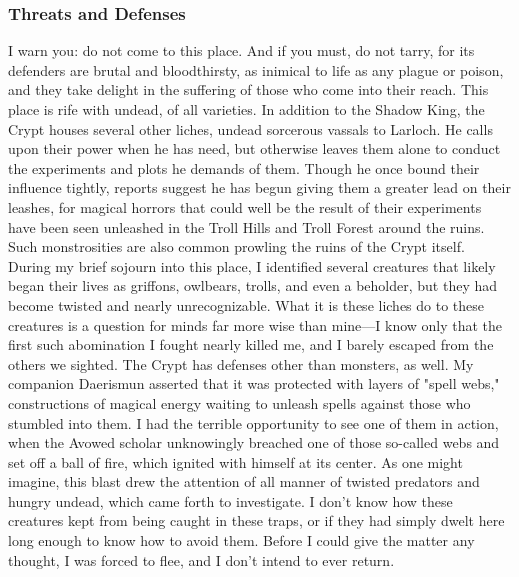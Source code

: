 \documentclass[10pt,a4paper,twoside,twocolumn,openany,bg=print,nodeprecatedcode]{dndbook}
\begin{document}
\subsubsection{Threats and Defenses}
I warn you: do not come to this place. And if you must, do not tarry, for its defenders are brutal and bloodthirsty, as inimical to life as any plague or poison, and they take delight in the suffering of those who come into their reach.
This place is rife with undead, of all varieties. In addition to the Shadow King, the Crypt houses several other liches, undead sorcerous vassals to Larloch. He calls upon their power when he has need, but otherwise leaves them alone to conduct the experiments and plots he demands of them. Though he once bound their influence tightly, reports suggest he has begun giving them a greater lead on their leashes, for magical horrors that could well be the result of their experiments have been seen unleashed in the Troll Hills and Troll Forest around the ruins.
Such monstrosities are also common prowling the ruins of the Crypt itself. During my brief sojourn into this place, I identified several creatures that likely began their lives as griffons, owlbears, trolls, and even a beholder, but they had become twisted and nearly unrecognizable. What it is these liches do to these creatures is a question for minds far more wise than mine—I know only that the first such abomination I fought nearly killed me, and I barely escaped from the others we sighted.
The Crypt has defenses other than monsters, as well. My companion Daerismun asserted that it was protected with layers of "spell webs," constructions of magical energy waiting to unleash spells against those who stumbled into them. I had the terrible opportunity to see one of them in action, when the Avowed scholar unknowingly breached one of those so-called webs and set off a ball of fire, which ignited with himself at its center.
As one might imagine, this blast drew the attention of all manner of twisted predators and hungry undead, which came forth to investigate. I don't know how these creatures kept from being caught in these traps, or if they had simply dwelt here long enough to know how to avoid them. Before I could give the matter any thought, I was forced to flee, and I don't intend to ever return.
\end{document}
